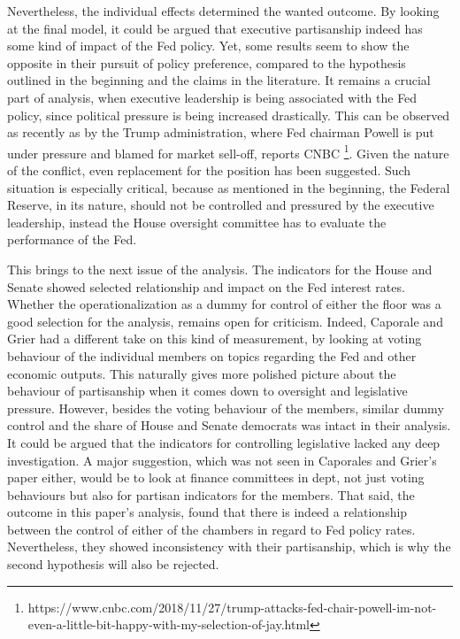 \documentclass[11pt]{article}
\begin{document}
	Nevertheless, the individual effects determined the wanted outcome. By looking at the final model, it could be argued that executive partisanship indeed has some kind of impact of the Fed policy. Yet, some results seem to show the opposite in their pursuit of policy preference, compared to the hypothesis outlined in the beginning and the claims in the literature. It remains a crucial part of analysis, when executive leadership is being associated with the Fed policy, since political pressure is being increased drastically. This can be observed as recently as by the Trump administration, where Fed chairman Powell is put under pressure and blamed for market sell-off, reports CNBC \footnote{https://www.cnbc.com/2018/11/27/trump-attacks-fed-chair-powell-im-not-even-a-little-bit-happy-with-my-selection-of-jay.html}. Given the nature of the conflict, even replacement for the position has been suggested. Such situation is especially critical, because as mentioned in the beginning, the Federal Reserve, in its nature, should not be controlled and pressured by the executive leadership, instead the House oversight committee has to evaluate the performance of the Fed. \
	
	This brings to the next issue of the analysis. The indicators for the House and Senate showed selected relationship and impact on the Fed interest rates. Whether the operationalization as a dummy for control of either the floor was a good selection for the analysis, remains open for criticism. Indeed, Caporale and Grier had a different take on this kind of measurement, by looking at voting behaviour of the individual members on topics regarding the Fed and other economic outputs. This naturally gives more polished picture about the behaviour of partisanship when it comes down to oversight and legislative pressure. However, besides the voting behaviour of the members, similar dummy control and the share of House and Senate democrats was intact in their analysis. It could be argued that the indicators for controlling legislative lacked any deep investigation. A major suggestion, which was not seen in Caporales and Grier’s paper either, would be to look at finance committees in dept, not just voting behaviours but also for partisan indicators for the members. That said, the outcome in this paper’s analysis, found that there is indeed a relationship between the control of either of the chambers in regard to Fed policy rates. Nevertheless, they showed inconsistency with their partisanship, which is why the second hypothesis will also be rejected. \
	
\end{document}
